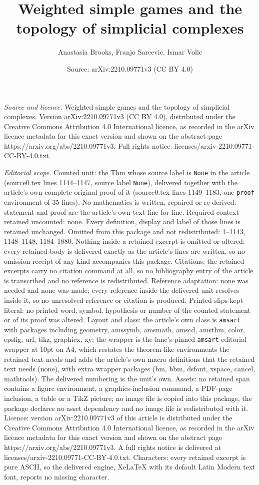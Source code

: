 \documentclass[10pt,a4paper]{amsart}
\title[Weighted simple games and the topology of simplicial complex]{Weighted simple games and the topology of simplicial complexes}
\author{Anastasia Brooks, Franjo Sarcevic, Ismar Volic}
\date{Source: arXiv:2210.09771v3 (CC BY 4.0)}
\begin{document}
\maketitle

\noindent\emph{Source and licence.} Weighted simple games and the topology of simplicial complexes. Version arXiv:2210.09771v3 (CC BY 4.0), distributed under the Creative Commons Attribution 4.0 International licence, as recorded in the arXiv licence metadata for this exact version and shown on the abstract page https://arxiv.org/abs/2210.09771v3. Full rights notice: licenses/arxiv-2210.09771-CC-BY-4.0.txt.\par\smallskip

\noindent\textit{Editorial scope.} Counted unit: the Thm whose source label is \texttt{None} in the article (source0.tex lines 1144--1147, source label \texttt{None}), delivered together with the article's own complete original proof of it (source0.tex lines 1149--1183, one \texttt{proof} environment of 35 lines). No mathematics is written, repaired or re-derived: statement and proof are the article's own text line for line. Required context retained uncounted: none. Every definition, display and label of those lines is retained unchanged. Omitted from this package and not redistributed: 1--1143, 1148--1148, 1184--1880. Nothing inside a retained excerpt is omitted or altered: every retained body is delivered exactly as the article's lines are written, so no omission receipt of any kind accompanies this package. Citations: the retained excerpts carry no citation command at all, so no bibliography entry of the article is transcribed and no reference is redistributed. Reference adaptation: none was needed and none was made; every reference inside the delivered unit resolves inside it, so no unresolved reference or citation is produced. Printed slips kept literal: no printed word, symbol, hypothesis or number of the counted statement or of its proof was altered. Layout and class: the article's own class is \texttt{amsart} with packages including geometry, amssymb, amsmath, amscd, amsthm, color, epsfig, url, tikz, graphicx, xy; the wrapper is the lane's pinned \texttt{amsart} editorial wrapper at 10pt on A4, which restates the theorem-like environments the retained text needs and adds the article's own macro definitions that the retained text needs (none), with extra wrapper packages (bm, bbm, dsfont, xspace, cancel, mathtools). The delivered numbering is the unit's own. Assets: no retained span contains a figure environment, a graphics-inclusion command, a PDF-page inclusion, a table or a TikZ picture; no image file is copied into this package, the package declares no asset dependency and no image file is redistributed with it. Licence: version arXiv:2210.09771v3 of this article is distributed under the Creative Commons Attribution 4.0 International licence, as recorded in the arXiv licence metadata for this exact version and shown on the abstract page https://arxiv.org/abs/2210.09771v3. A full rights notice is delivered at licenses/arxiv-2210.09771-CC-BY-4.0.txt. Characters: every retained excerpt is pure ASCII, so the delivered engine, XeLaTeX with its default Latin Modern text font, reports no missing character.
\end{document}
